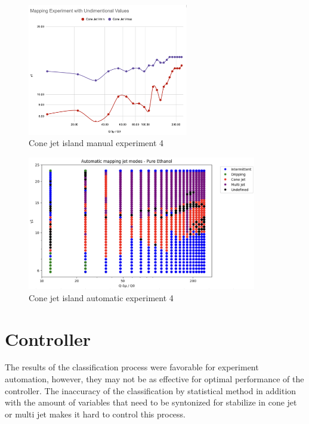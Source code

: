     \begin{multicols}{2}

        \begin{figure}[H]
            \center
            \includegraphics[width=7cm]{Figuras/april/manual_non_dim_exp.png}
            \caption{Cone jet island manual experiment 4}
        \end{figure}

        \begin{figure}[H]
            \center
            \includegraphics[width=10cm]{Figuras/19:03/non-dimensional-1.png}
            \caption{Cone jet island automatic experiment 4}
        \end{figure}


    \end{multicols}

\section{Controller}
\label{sec:controller_results}

    The results of the classification process were favorable for experiment automation, however, they may not be as effective for optimal performance of the controller.
    The inaccuracy of the classification by statistical method in addition with the amount of variables that need to be syntonized for stabilize in cone jet or multi jet makes it hard to control this process.

